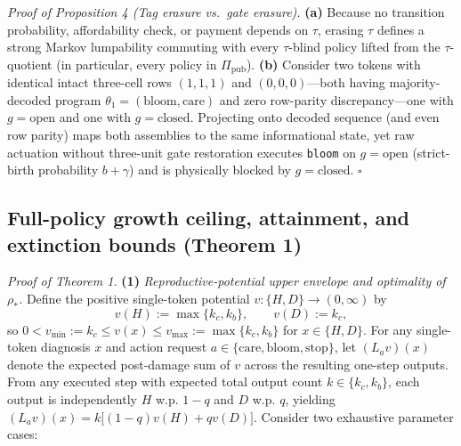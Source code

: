 \documentclass[11pt,a4paper]{article}
\begin{document}
\emph{Proof of Proposition 4 (Tag erasure vs.~gate erasure).}
\textbf{(a)} Because no transition probability, affordability check, or
payment depends on \(\tau\), erasing \(\tau\) defines a strong Markov
lumpability \citep{burkeRosenblatt1958} commuting with every
\(\tau\)-blind policy lifted from the \(\tau\)-quotient (in particular,
every policy in \(\Pi_{\mathrm{pub}}\)). \textbf{(b)} Consider two
tokens with identical intact three-cell rows \((1,1,1)\) and
\((0,0,0)\)---both having majority-decoded program
\(\theta_1 = (\mathrm{bloom}, \mathrm{care})\) and zero row-parity
discrepancy---one with \(g = \mathrm{open}\) and one with
\(g = \mathrm{closed}\). Projecting onto decoded sequence (and even row
parity) maps both assemblies to the same informational state, yet raw
actuation without three-unit gate restoration executes \texttt{bloom} on
\(g = \mathrm{open}\) (strict-birth probability \(b+\gamma\)) and is
physically blocked by \(g = \mathrm{closed}\). \(\square\)

\subsection{Full-policy growth ceiling, attainment, and extinction
bounds (Theorem
1)}\label{full-policy-growth-ceiling-attainment-and-extinction-bounds-theorem-1}

\emph{Proof of Theorem 1.} \textbf{(1)} \emph{Reproductive-potential
upper envelope and optimality of \(\rho_*\).} Define the positive
single-token potential \(v: \{H, D\} \to (0, \infty)\) by
\[v(H) := \max\{k_c, k_b\}, \qquad v(D) := k_c,\] so
\(0 < v_{\min} := k_c \le v(x) \le v_{\max} := \max\{k_c, k_b\}\) for
\(x \in \{H, D\}\). For any single-token diagnosis \(x\) and action
request \(a \in \{\mathrm{care}, \mathrm{bloom}, \mathrm{stop}\}\), let
\((L_a v)(x)\) denote the expected post-damage sum of \(v\) across the
resulting one-step outputs. From any executed step with expected total
output count \(k \in \{k_c, k_b\}\), each output is independently \(H\)
w.p. \(1-q\) and \(D\) w.p. \(q\), yielding
\((L_a v)(x) = k\bigl[(1-q)v(H) + q v(D)\bigr]\). Consider two
exhaustive parameter cases:
\end{document}
